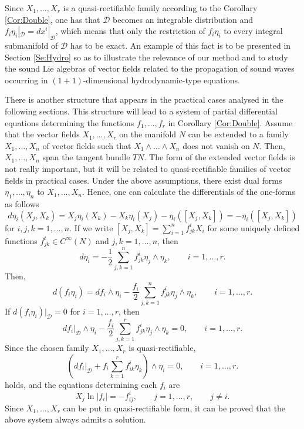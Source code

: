 \documentclass[12pt]{article}
\theoremstyle{plain}
\theoremstyle{definition}
\numberwithin{equation}{section}
\begin{document}
 Since $X_1,\ldots,X_r$ is a quasi-rectifiable family according to the Corollary \ref{Cor:Double}, one has that $\mathcal{D}$ becomes an integrable distribution and $f_i\eta_i|_\mathcal{D}=dx^i|_{\mathcal{D}}$, which means that only the restriction of $f_i\eta_i$ to every integral submanifold of $\mathcal{D}$ has to be exact. An example of this fact is to be presented in Section \ref{Se:Hydro} so as to illustrate the relevance of our method and to study the sound Lie algebras of vector fields related to the propagation of sound waves occurring in $(1+1)$-dimensional hydrodynamic-type equations. 

There is another structure that appears in the practical cases analysed in the following sections. This structure will lead to a system of partial differential equations determining the functions $f_1,\ldots,f_r$ in Corollary \ref{Cor:Double}. Assume that the vector fields $X_1,\ldots,X_r$ on the manifold $N$ can be extended to a family $X_1,\ldots,X_n$ of vector fields such that $X_1\wedge\ldots\wedge X_n$ does not vanish on $N$. Then, $X_1,\ldots,X_n$ span the  tangent bundle $TN$. The form of the extended vector fields is not really important, but it will be related to quasi-rectifiable families of vector fields in practical cases. Under the above assumptions, there exist dual forms $\eta_1,\ldots,\eta_n$ to $X_1,\ldots,X_n$. Hence, one can calculate the differentials of the one-forms as follows
$$
d\eta_i(X_j,X_k)=X_j\eta_i(X_k)-X_k\eta_i(X_j)-\eta_i([X_j,X_k])=-\eta_i([X_j,X_k])
$$
for $i,j,k=1,\ldots,n$. If we write $[X_j,X_k]=\sum_{i=1}^n f_{jk}^iX_i$ for some uniquely defined functions $f_{jk}^i\in C^\infty(N)$ and $j,k=1,\ldots,n$, then
$$
d\eta_i=-\frac 12\sum_{j,k=1}^nf^i_{jk}\eta_j\wedge \eta_k,\qquad i=1,\ldots,r.
$$
Then,
$$
d(f_i\eta_i)=df_i\wedge \eta_i-\frac {f_i}2\sum_{j,k=1}^nf^i_{jk}\eta_j\wedge \eta_k,\qquad i=1,\ldots,r.
$$
If $d(f_i\eta_i)|_\mathcal{D}=0$ for $i=1,\ldots,r$, then
$$
df_i|_{\mathcal{D}}\wedge\eta_i-\frac {f_i}2\sum_{j,k=1}^rf^i_{jk}\eta_j\wedge \eta_k=0,\qquad i=1,\ldots,r.
$$
Since the chosen family $X_1,\ldots,X_r$ is quasi-rectifiable,
$$
\left(df_i|_{\mathcal{D}}+ {f_i}\sum_{k=1}^rf^i_{ik}\eta_k\right)\wedge \eta_i=0,\qquad i=1,\ldots,r.
$$
holds, and the equations determining each $f_i$ are
$$
X_j\ln|f_i|=-f^i_{ij},\qquad j=1,\ldots,r, \qquad j\neq i.
$$
Since $X_1,\ldots,X_r$ can be put in quasi-rectifiable form, it can be proved that the above system always admits a solution.
\end{document}
